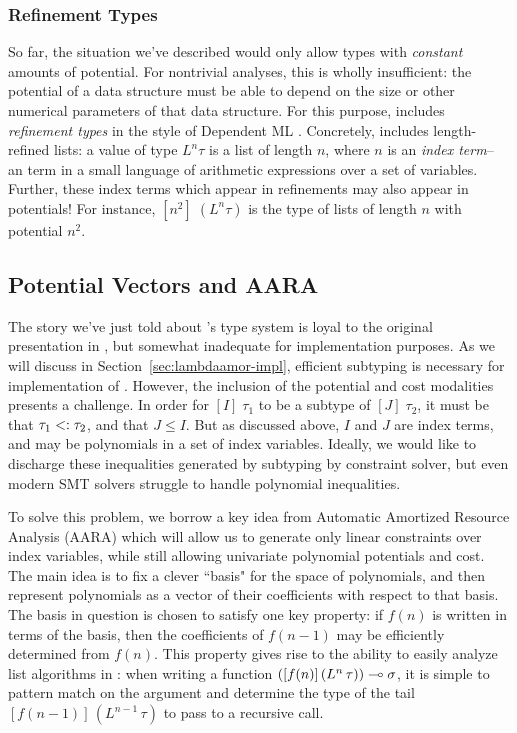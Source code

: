 \subsubsection{Refinement Types}
\label{sec:lambdaamor-overview-refty}
So far, the situation we've described would only allow types with \textit{constant} amounts of potential. For nontrivial analyses, this is wholly insufficient: the potential of a data structure must be able to depend on the size or other numerical parameters of that data structure. For this purpose, \lambdaamor includes \textit{refinement types} in the style of Dependent ML \citehere. Concretely, \lambdaamor includes length-refined lists: a value of type $L^n \tau$ is a list of length $n$, where $n$ is an \textit{index term}-- an term in a small language of arithmetic expressions over a set of variables. Further, these index terms which appear in refinements may also appear in potentials! For instance, $\left[n^2\right] \; (L^n \tau)$ is the type of lists of length $n$ with potential $n^2$.

\subsection{Potential Vectors and AARA}
The story we've just told about \lambdaamor's type system is loyal to the original presentation in \citep{rajani-et-al:popl21}, but somewhat inadequate for implementation purposes. As we will discuss in Section~\ref{sec:lambdaamor-impl}, efficient subtyping is necessary for implementation of \lambdaamor. However,
the inclusion of the potential and cost modalities presents a challenge. In order for $[I] \; \tau_1$ to be a subtype of $[J] \; \tau_2$, it must be that $\tau_1 <: \tau_2$, and that $J \leq I$. But as discussed above, $I$ and $J$ are index terms, and may be polynomials in a set of index variables. Ideally, we would like to discharge these inequalities generated by subtyping by constraint solver, but even modern SMT solvers struggle to handle polynomial inequalities.

To solve this problem, we borrow a key idea from Automatic Amortized Resource Analysis (AARA) \citehere which will allow us to generate only linear constraints over index variables, while still allowing univariate polynomial potentials and cost. The main idea is to fix a clever ``basis" for the space of polynomials, and then represent polynomials as a vector of their coefficients with respect to that basis. The basis in question is chosen to satisfy one key property: if $f(n)$ is written in terms of the basis, then the coefficients of $f(n-1)$ may be efficiently determined from $f(n)$. This property gives rise to the ability to easily analyze list algorithms in \lambdaamor: when writing a function $([f(n)] \, (L^n \, \tau)) \multimap \sigma$, it is simple to pattern match on the argument and determine the type of the tail $[f(n-1)] \, (L^{n-1} \, \tau)$ to pass to a recursive call.

